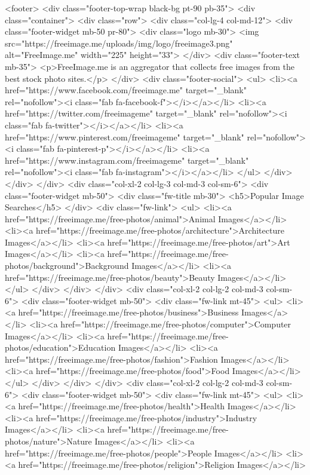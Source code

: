 <footer>
<div class="footer-top-wrap black-bg pt-90 pb-35">
<div class="container">
<div class="row">
<div class="col-lg-4 col-md-12">
<div class="footer-widget mb-50 pr-80">
<div class="logo mb-30">
<img src="https://freeimage.me/uploads/img/logo/freeimage3.png" alt="FreeImage.me" width="225" height="33">
</div>
<div class="footer-text mb-35">
<p>FreeImage.me is an aggregator that collects free images from the best stock photo sites.</p>
</div>
<div class="footer-social">
<ul>
<li><a href="https://www.facebook.com/freeimage.me" target="_blank" rel="nofollow"><i class="fab fa-facebook-f"></i></a></li>
<li><a href="https://twitter.com/freeimageme" target="_blank" rel="nofollow"><i class="fab fa-twitter"></i></a></li>
<li><a href="https://www.pinterest.com/freeimageme" target="_blank" rel="nofollow"><i class="fab fa-pinterest-p"></i></a></li>
<li><a href="https://www.instagram.com/freeimageme" target="_blank" rel="nofollow"><i class="fab fa-instagram"></i></a></li>
</ul>
</div>
</div>
</div>
<div class="col-xl-2 col-lg-3 col-md-3 col-sm-6">
<div class="footer-widget mb-50">
<div class="fw-title mb-30">
<h5>Popular Image Searches</h5>
</div>
<div class="fw-link">
<ul>
<li><a href="https://freeimage.me/free-photos/animal">Animal Images</a></li>
<li><a href="https://freeimage.me/free-photos/architecture">Architecture Images</a></li>
<li><a href="https://freeimage.me/free-photos/art">Art Images</a></li>
<li><a href="https://freeimage.me/free-photos/background">Background Images</a></li>
<li><a href="https://freeimage.me/free-photos/beauty">Beauty Images</a></li>
</ul>
</div>
</div>
</div>
<div class="col-xl-2 col-lg-2 col-md-3 col-sm-6">
<div class="footer-widget mb-50">
<div class="fw-link mt-45">
<ul>
<li><a href="https://freeimage.me/free-photos/business">Business Images</a></li>
<li><a href="https://freeimage.me/free-photos/computer">Computer Images</a></li>
<li><a href="https://freeimage.me/free-photos/education">Education Images</a></li>
<li><a href="https://freeimage.me/free-photos/fashion">Fashion Images</a></li>
<li><a href="https://freeimage.me/free-photos/food">Food Images</a></li>
</ul>
</div>
</div>
</div>
<div class="col-xl-2 col-lg-2 col-md-3 col-sm-6">
<div class="footer-widget mb-50">
<div class="fw-link mt-45">
<ul>
<li><a href="https://freeimage.me/free-photos/health">Health Images</a></li>
<li><a href="https://freeimage.me/free-photos/industry">Industry Images</a></li>
<li><a href="https://freeimage.me/free-photos/nature">Nature Images</a></li>
<li><a href="https://freeimage.me/free-photos/people">People Images</a></li>
<li><a href="https://freeimage.me/free-photos/religion">Religion Images</a></li>

